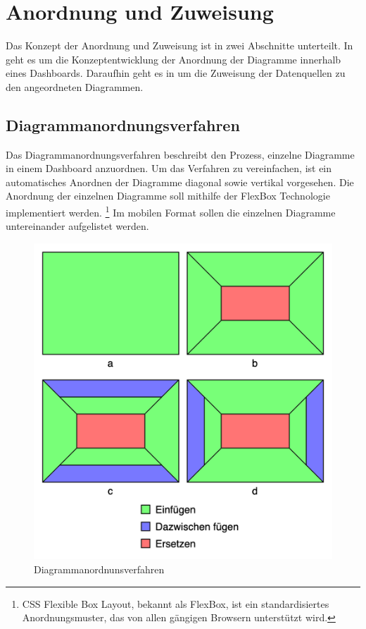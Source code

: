 \section{Anordnung und Zuweisung}
\label{sec:andordnungundzuweisung}
Das Konzept der Anordnung und Zuweisung ist in zwei Abschnitte unterteilt.
In  geht es um die Konzeptentwicklung
der Anordnung der Diagramme innerhalb eines Dashboards. Daraufhin geht
es in  um die Zuweisung der Datenquellen
zu den angeordneten Diagrammen.

\subsection{Diagrammanordnungsverfahren}
\label{subsec:diagrammanordnungsverfahren}
Das Diagrammanordnungsverfahren beschreibt den Prozess, einzelne Diagramme in einem Dashboard anzuordnen.
Um das Verfahren zu vereinfachen, ist ein automatisches Anordnen der Diagramme diagonal sowie vertikal vorgesehen.
Die Anordnung der einzelnen Diagramme soll mithilfe der FlexBox Technologie implementiert werden.
\footnote{CSS Flexible Box Layout, bekannt als FlexBox, ist ein standardisiertes Anordnungsmuster, das von allen gängigen Browsern unterstützt wird.\cite{CanIUseFlexBox}}
Im mobilen Format sollen die einzelnen Diagramme untereinander aufgelistet werden. 

\begin{figure}
    \begin{center}
    \includegraphics[scale=0.2]{img/abbildungen/DiagrammanordnungsverfahrenMitLegende}
    \end{center}
    \caption{Diagrammanordnunsverfahren}
    \label{figure:diagrammanordnungabbildung}
\end{figure}

